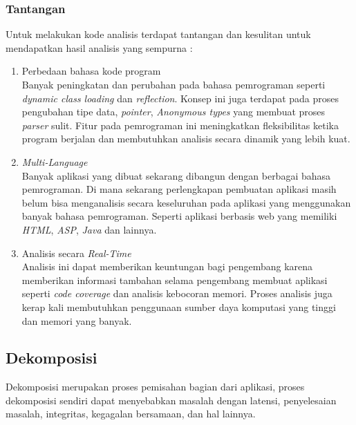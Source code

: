 \subsubsection{Tantangan}
Untuk melakukan kode analisis terdapat tantangan dan kesulitan untuk mendapatkan hasil analisis yang sempurna \cite{208}:
\begin{enumerate}[leftmargin=1.3cm]
	\item Perbedaan bahasa kode program\\
	Banyak peningkatan dan perubahan pada bahasa pemrograman seperti \textit{dynamic class loading} dan \textit{reflection}. Konsep ini juga terdapat pada proses pengubahan tipe data, \textit{pointer}, \textit{Anonymous types} yang membuat proses \textit{parser} sulit. Fitur pada pemrograman ini meningkatkan fleksibilitas ketika program berjalan dan membutuhkan analisis secara dinamik yang lebih kuat.
	\item \textit{Multi-Language}\\
	Banyak aplikasi yang dibuat sekarang dibangun dengan berbagai bahasa pemrograman. Di mana sekarang perlengkapan pembuatan aplikasi masih belum bisa menganalisis secara keseluruhan pada aplikasi yang menggunakan banyak bahasa pemrograman. Seperti aplikasi berbasis web yang memiliki \textit{HTML}, \textit{ASP}, \textit{Java} dan lainnya.
	\item Analisis secara \textit{Real-Time}\\
	Analisis ini dapat memberikan keuntungan bagi pengembang karena memberikan informasi tambahan selama pengembang membuat aplikasi seperti \textit{code coverage} dan analisis kebocoran memori. Proses analisis juga kerap kali membutuhkan penggunaan sumber daya komputasi yang tinggi dan memori yang banyak.\\
\end{enumerate}

\subsection{Dekomposisi}
Dekomposisi merupakan proses pemisahan bagian dari aplikasi, proses dekomposisi sendiri dapat menyebabkan masalah dengan latensi, penyelesaian masalah, integritas, kegagalan bersamaan, dan hal lainnya. 

